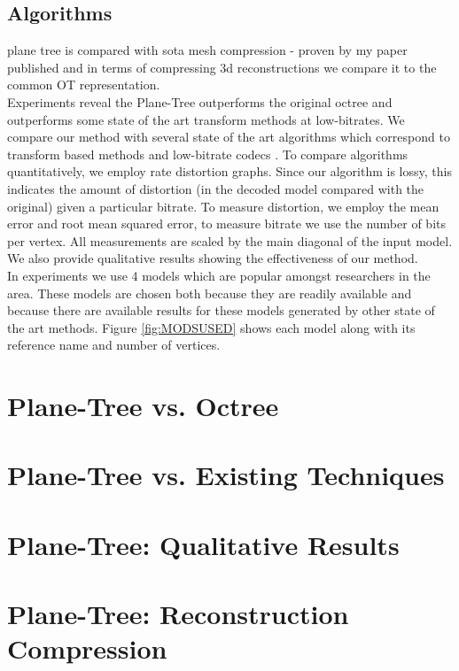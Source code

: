 \subsection{Algorithms} \label{AlgorithmsSection} 




plane tree is compared with sota mesh compression - proven by my paper published and in terms of compressing 3d reconstructions we compare it to the common OT representation. \\

Experiments reveal the Plane-Tree outperforms the original octree and outperforms some state of the art transform methods at low-bitrates. We compare our method with several state of the art algorithms which correspond to transform based methods \cite{Khodakovsky00Progressive,Bayazit103DMesh} and low-bitrate codecs \cite{Peng10Feature}. To compare algorithms quantitatively, we employ rate distortion graphs. Since our algorithm is lossy, this indicates the amount of distortion (in the decoded model compared with the original) given a particular bitrate. To measure distortion, we employ the mean error and root mean squared error, to measure bitrate we use the number of bits per vertex. All measurements are scaled by the main diagonal of the input model. We also provide qualitative results showing the effectiveness of our method. \\

In experiments we use 4 models which are popular amongst researchers in the area. These models are chosen both because they are readily available and because there are available results for these models generated by other state of the art methods. Figure \ref{fig:MODSUSED} shows each model along with its reference name and number of vertices. \\

\section{Plane-Tree vs. Octree}

\section{Plane-Tree vs. Existing Techniques}

\section{Plane-Tree: Qualitative Results}

\section{Plane-Tree: Reconstruction Compression}




